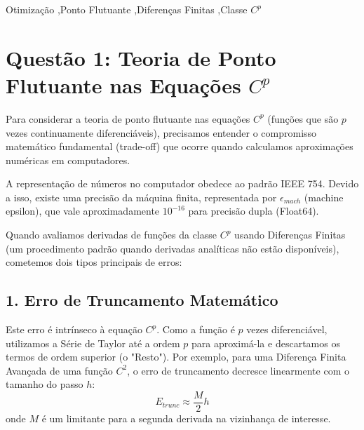 \documentclass[preprint,12pt]{elsarticle}
\begin{document}
\begin{frontmatter}

\begin{keyword}
Otimiza\c{c}\~ao \sep Ponto Flutuante \sep Diferen\c{c}as Finitas \sep Classe $C^p$
\end{keyword}

\end{frontmatter}


\section{Quest\~ao 1: Teoria de Ponto Flutuante nas Equa\c{c}\~oes $C^p$}
\label{sec:q1}

Para considerar a teoria de ponto flutuante nas equa\c{c}\~oes $C^p$ (fun\c{c}\~oes que s\~ao $p$ vezes continuamente diferenci\'aveis), precisamos entender o compromisso matem\'atico fundamental (trade-off) que ocorre quando calculamos aproxima\c{c}\~oes num\'ericas em computadores.

A representa\c{c}\~ao de n\'umeros no computador obedece ao padr\~ao IEEE 754. Devido a isso, existe uma precis\~ao da m\'aquina finita, representada por $\epsilon_{mach}$ (machine epsilon), que vale aproximadamente $10^{-16}$ para precis\~ao dupla (Float64).

Quando avaliamos derivadas de fun\c{c}\~oes da classe $C^p$ usando Diferen\c{c}as Finitas (um procedimento padr\~ao quando derivadas anal\'iticas n\~ao est\~ao dispon\'iveis), cometemos dois tipos principais de erros:

\subsection{1. Erro de Truncamento Matem\'atico}
Este erro \'e intr\'inseco \`a equa\c{c}\~ao $C^p$. Como a fun\c{c}\~ao \'e $p$ vezes diferenci\'avel, utilizamos a S\'erie de Taylor at\'e a ordem $p$ para aproxim\'a-la e descartamos os termos de ordem superior (o "Resto"). Por exemplo, para uma Diferen\c{c}a Finita Avan\c{c}ada de uma fun\c{c}\~ao $C^2$, o erro de truncamento decresce linearmente com o tamanho do passo $h$:
\begin{equation}
E_{trunc} \approx \frac{M}{2} h
\end{equation}
onde $M$ \'e um limitante para a segunda derivada na vizinhan\c{c}a de interesse.
\end{document}

